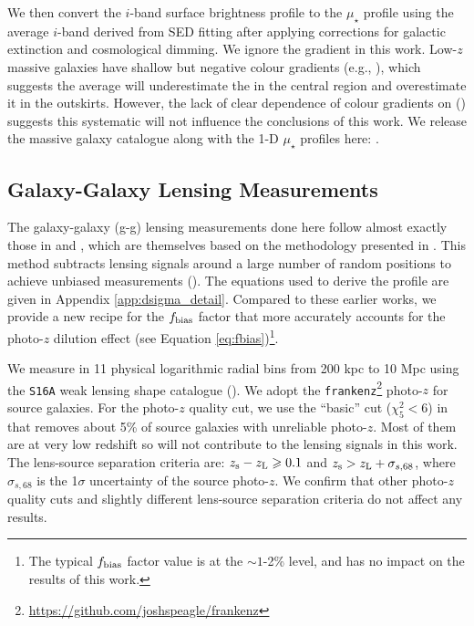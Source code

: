\documentclass[fleqn,usenatbib,useAMS]{mnras}
\begin{document}
\begin{CJK*}{UTF8}{gbsn}
    We then convert the $i$-band surface brightness profile to the $\mu_{\star}$ profile using the
    average $i$-band \mlratio{} derived from SED fitting after applying corrections for
    galactic extinction and cosmological dimming.
    We ignore the \mlratio{} gradient in this work.
    Low-$z$ massive galaxies have shallow but negative colour gradients (e.g., \citealt{Huang2018b,
    Wang2019, Montes2021}), which suggests the average \mlratio{} will underestimate the \mstar{} in
    the central region and overestimate it in the outskirts.
    However, the lack of clear dependence of colour gradients on \mstar{} (\citealt{Huang2018b})
    suggests this systematic will not influence the conclusions of this work.
    We release the massive galaxy catalogue along with the 1-D $\mu_{\star}$ profiles here: 
    \href{https://zenodo.org/record/5259075}{\faDatabase}.

\subsection{Galaxy-Galaxy Lensing Measurements}
    \label{sec:dsigma}

    The galaxy-galaxy (g-g) lensing measurements done here follow almost exactly those in 
    \citet{Speagle2019} and \citet{Huang2020}, which are themselves based on the methodology 
    presented in \citet{Leauthaud2017}.
    This method subtracts lensing signals around a large number of random positions to achieve
    unbiased measurements (\citealt{Singh2017}). 
    The equations used to derive the \dsigma{} profile are given in Appendix
    \ref{app:dsigma_detail}.
    Compared to these earlier works, we provide a new recipe for the $f_{\rm bias}$ factor that more
    accurately accounts for the photo-$z$ dilution effect (see Equation \ref{eq:fbias})\footnote{The
    typical $f_{\rm bias}$ factor value is at the $\sim 1$-2\% level, and has no impact on the
    results of this work.}.

    We measure \dsigma{} in 11 physical logarithmic radial bins from 200 kpc to 10 Mpc using 
    the \texttt{S16A} weak lensing shape catalogue (\citealt{HSC-WLCAT, HSC-WLCALIB}). 
    We adopt the \texttt{frankenz}\footnote{\url{https://github.com/joshspeagle/frankenz}} photo-$z$
    for source galaxies. 
    For the photo-$z$ quality cut, we use the ``basic'' cut ($\chi^{2}_{5} < 6$) in 
    \citet{Speagle2019} that removes about 5\% of source galaxies with unreliable photo-$z$.
    Most of them are at very low redshift so will not contribute to the lensing signals in this work.
    The lens-source separation criteria are: $z_{\rm s} - z_{\rm L} \ge 0.1$ and
    $z_{\rm s} > z_{\rm L} + \sigma_{s,68}$, where $\sigma_{s,68}$ is the 1$\sigma$ uncertainty
    of the source photo-$z$.
    We confirm that other photo-$z$ quality cuts and slightly different lens-source separation
    criteria do not affect any results.


\end{CJK*}
\end{document}
